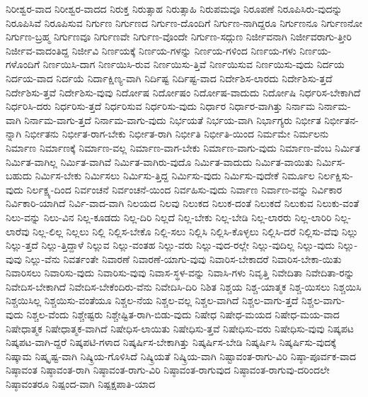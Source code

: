 {ನಿರೀಶ್ವರ-ವಾದ
ನಿರೀಶ್ವರ-ವಾದದ
ನಿರುಕ್ತ
ನಿರುತ್ಸಾಹ
ನಿರುತ್ಸಾಹಿ
ನಿರುಪಮವೂ
ನಿರೂಪಣೆ
ನಿರೂಪಿಸಿರು-ವುದನ್ನು
ನಿರೂಪಿಸಿವೆ
ನಿರೂಪಿಸುವ
ನಿರ್ಗುಣ
ನಿರ್ಗುಣದ
ನಿರ್ಗುಣ-ದೊಂದಿಗೆ
ನಿರ್ಗುಣ-ನಾಗಿದ್ದರೂ
ನಿರ್ಗುಣನೂ
ನಿರ್ಗುಣನೋ
ನಿರ್ಗುಣ-ಬ್ರಹ್ಮ
ನಿರ್ಗುಣವೂ
ನಿರ್ಗುಣವೇ
ನಿರ್ಗುಣ-ವೊಂದೇ
ನಿರ್ಗುಣ-ಸದ್ಗುಣ
ನಿರ್ಜೀವನಾಗಿ
ನಿರ್ಜೀವರಾಗು-ತ್ತೀರಿ
ನಿರ್ಜೀವ-ವಾದಂತಿದ್ದ
ನಿರ್ಜೀವಿ
ನಿರ್ಣಯಕ್ಕೆ
ನಿರ್ಣಯ-ಗಳನ್ನು
ನಿರ್ಣಯ-ಗಳಿಂದ
ನಿರ್ಣಯ-ಗಳು
ನಿರ್ಣಯ-ಗಳೊಂದಿಗೆ
ನಿರ್ಣಯಿಸಿ-ದಾಗ
ನಿರ್ಣಯಿಸಿ-ರುವ
ನಿರ್ಣಯಿಸು-ತ್ತಿವೆ
ನಿರ್ಣಯಿಸುವ
ನಿರ್ಣಯಿಸು-ವುದು
ನಿರ್ದಯ
ನಿರ್ದಯ-ವಾದ
ನಿರ್ದಯೆ
ನಿರ್ದಾಕ್ಷಿಣ್ಯ-ವಾಗಿ
ನಿರ್ದಿಷ್ಟ
ನಿರ್ದಿಷ್ಟ-ವಾದ
ನಿರ್ದೇಶಿಸ-ಲಾರದು
ನಿರ್ದೇಶಿಸು-ತ್ತದೆ
ನಿರ್ದೇಶಿಸು-ತ್ತವೆ
ನಿರ್ದೇಶಿಸು-ವುವು
ನಿರ್ದೋಷ
ನಿರ್ದೋಷಂ
ನಿರ್ದೋಷ-ವಾದುದು
ನಿರ್ದೋಷಿ
ನಿರ್ಧರಿಸ-ಬೇಕಾಗಿದೆ
ನಿರ್ಧರಿಸಿ-ದರು
ನಿರ್ಧರಿಸು-ತ್ತದೆ
ನಿರ್ಧರಿಸುವ
ನಿರ್ಧರಿಸು-ವುದು
ನಿರ್ಧಾರ
ನಿರ್ಧಾರ-ವಾಗಿತ್ತು
ನಿರ್ನಾಮ
ನಿರ್ನಾಮ-ವಾಗಿ
ನಿರ್ನಾಮ-ವಾಗು-ತ್ತದೆ
ನಿರ್ನಾಮ-ವಾಗು-ವುದು
ನಿರ್ಭಯತೆ
ನಿರ್ಭಯ-ವಾಗಿ
ನಿರ್ಭಾಗ್ಯರು
ನಿರ್ಭೀತ
ನಿರ್ಭೀತನ-ನ್ನಾಗಿ
ನಿರ್ಭೀತನು
ನಿರ್ಭೀತ-ರಾಗ-ಬೇಕು
ನಿರ್ಭೀತ-ರಾಗಿ
ನಿರ್ಭೀತಿ
ನಿರ್ಭೀತಿ-ಯಿಂದ
ನಿರ್ಮಮೇ
ನಿರ್ಮಲನು
ನಿರ್ಮಾಣ
ನಿರ್ಮಾಣಕ್ಕೆ
ನಿರ್ಮಾಣ-ವಲ್ಲ
ನಿರ್ಮಾಣ-ವಾಗ-ಬೇಕು
ನಿರ್ಮಾಣ-ವಾಗು-ವುದು
ನಿರ್ಮಾಣ-ವೆಂಬ
ನಿರ್ಮಿತ
ನಿರ್ಮಿತ-ವಾಗಿಲ್ಲ
ನಿರ್ಮಿತ-ವಾಗಿವೆ
ನಿರ್ಮಿತ-ವಾಗಿರು-ವುದೊ
ನಿರ್ಮಿತ-ವಾದುದು
ನಿರ್ಮಿತ-ವಾಯಿತು
ನಿರ್ಮಿಸ-ಬಹುದು
ನಿರ್ಮಿಸ-ಬೇಕು
ನಿರ್ಮಿಸಲು
ನಿರ್ಮಿಸು-ತ್ತಿದ್ದ
ನಿರ್ಮಿಸು-ವುದು
ನಿರ್ಮಿಸು-ವುದೇಕೆ
ನಿರ್ಮೂಲ
ನಿರ್ಲಕ್ಷಿಸು-ವುದು
ನಿರ್ಲಕ್ಷ್ಯ-ದಿಂದ
ನಿರ್ವಂಚನೆ
ನಿರ್ವಂಚನೆ-ಯಿಂದ
ನಿರ್ವಹಿಸು-ವುದು
ನಿರ್ವಾಣ
ನಿರ್ವಾಣ-ವನ್ನು
ನಿರ್ವಿಕಾರ
ನಿರ್ವಿಕಾರಿ-ಯಾಗಿದೆ
ನಿರ್ವಿ-ವಾದ-ವಾಗಿ
ನಿಲಯದ
ನಿಲವು
ನಿಲುಕದ
ನಿಲುಕ-ದಂತೆ
ನಿಲುಕದೆ
ನಿಲುಕುವ
ನಿಲುಕು-ವಂತೆ
ನಿಲು-ವನ್ನು
ನಿಲು-ವಿನ
ನಿಲ್ಲ-ಕೂಡದು
ನಿಲ್ಲ-ದಿರಿ
ನಿಲ್ಲದೆ
ನಿಲ್ಲ-ಬೇಕು
ನಿಲ್ಲ-ಬೇಡಿ
ನಿಲ್ಲ-ಲಾರರು
ನಿಲ್ಲ-ಲಾರಿರಿ
ನಿಲ್ಲ-ಲಾರೆವು
ನಿಲ್ಲ-ಲಿಲ್ಲ
ನಿಲ್ಲಲು
ನಿಲ್ಲಿ
ನಿಲ್ಲಿಸ-ಬೇಕೊ
ನಿಲ್ಲಿ-ಸಲು
ನಿಲ್ಲಿಸಿ
ನಿಲ್ಲಿಸಿ-ಕೊಳ್ಳಲು
ನಿಲ್ಲಿಸಿ-ದರೆ
ನಿಲ್ಲಿಸು-ವೆವು
ನಿಲ್ಲು
ನಿಲ್ಲು-ತ್ತದೆ
ನಿಲ್ಲು-ತ್ತಿದ್ದಾಳೆ
ನಿಲ್ಲುವ
ನಿಲ್ಲು-ವಂತಹ
ನಿಲ್ಲು-ವರು
ನಿಲ್ಲು-ವುದ-ರಲ್ಲೇ
ನಿಲ್ಲು-ವುದಿಲ್ಲ
ನಿಲ್ಲು-ವುದು
ನಿಲ್ಲು-ವುವು
ನಿಲ್ಲು-ವೆನು
ನಿವರ್ತಂತೇ
ನಿವಾರಣೆ
ನಿವಾರಣೆ-ಯಾಗು-ವುವು
ನಿವಾರಿಸ-ಬೇಕಾದರೆ
ನಿವಾರಿಸ-ಬೇಕಾ-ಯಿತು
ನಿವಾರಿಸಲು
ನಿವಾರಿಸು-ವುದು
ನಿವಾರಿಸು-ವುವು
ನಿವಾಸ-ಸ್ಥಳ-ವನ್ನು
ನಿವಾಸಿ-ಗಳು
ನಿವೃತ್ತಿ
ನಿವೇದಿತಾ
ನಿವೇದಿತಾ-ರನ್ನು
ನಿವೇದಿಸ-ಬೇಕಾಗಿದೆ
ನಿವೇದಿಸ-ಬೇಕೆಂದಿರು-ವೆನು
ನಿವೇದಿಸಿ-ದಿರಿ
ನಿಶಿತ
ನಿಶ್ಚಯ
ನಿಶ್ಚ-ಯಾತ್ಮಕ
ನಿಶ್ಚ-ಯಿಸಲು
ನಿಶ್ಚಯಿಸಿ
ನಿಶ್ಚಯಿಸಿಲ್ಲ
ನಿಶ್ಚಯಿಸು-ವಂತೆಯೂ
ನಿಶ್ಚಲ-ನೆಯ
ನಿಶ್ಚಲ-ವಲ್ಲ
ನಿಶ್ಚಲ-ವಾಗಿದೆ
ನಿಶ್ಚಲ-ವಾಗು-ತ್ತದೆ
ನಿಶ್ಚಲ-ವಾಗು-ವುದು
ನಿಶ್ಚಲ-ವೆಂದು
ನಿಶ್ಚೇಷ್ಟರು
ನಿಶ್ಚೇಷ್ಟಿತ-ರಾಗಿ-ಬಿಡು-ವುದು
ನಿಷೇಧ
ನಿಷೇಧ-ಮಯದ
ನಿಷೇಧ-ಮಯ-ವಾದ
ನಿಷೇಧಾತ್ಮಕ
ನಿಷೇಧಾತ್ಮಕ-ವಾಗಿದೆ
ನಿಷೇಧಿಸ-ಲಾಯಿತು
ನಿಷೇಧಿಸು-ತ್ತವೆ
ನಿಷೇಧಿಸು-ವರು
ನಿಷೇಧಿಸು-ವುವು
ನಿಷ್ಕಪಟ
ನಿಷ್ಕಪಟ-ವಾಗಿ-ದ್ದರೆ
ನಿಷ್ಕಪಟಿ-ಗಳಾದ
ನಿಷ್ಕರ್ಷಿಸ-ಬೇಕಾಗಿತ್ತು
ನಿಷ್ಕರ್ಷಿಸ-ಬೇಡಿ
ನಿಷ್ಕರ್ಷಿಸಿ
ನಿಷ್ಕರ್ಷಿಸು-ವುದಕ್ಕೆ
ನಿಷ್ಕಾಮ
ನಿಷ್ಕೃಷ್ಟ-ವಾಗಿ
ನಿಷ್ಕ್ರಿಯ-ಗೊಳಿಸಿದೆ
ನಿಷ್ಕ್ರಿಯತೆ
ನಿಷ್ಕ್ರಿಯ-ವಾಗಿ
ನಿಷ್ಟಾವಂತ-ರಾಗು-ವಿರಿ
ನಿಷ್ಠಾ-ಪೂರ್ವಕ-ವಾದ
ನಿಷ್ಠಾವಂತ
ನಿಷ್ಠಾವಂತ-ರಾಗಿ
ನಿಷ್ಠಾವಂತ-ರಾಗು-ವಿರಿ
ನಿಷ್ಠಾವಂತ-ರಾಗುವುದ
ನಿಷ್ಠಾವಂತ-ರಾಗುವು-ದರಿಂದಲೇ
ನಿಷ್ಠಾವಂತರೂ
ನಿಷ್ಪಂದ-ವಾಗಿ
ನಿಷ್ಪಕ್ಷಪಾತಿ-ಯಾದ
}
